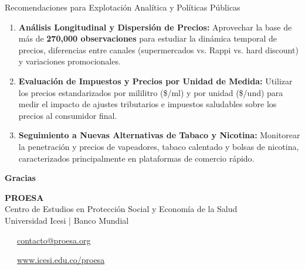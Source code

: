 \documentclass[aspectratio=169, 10pt]{beamer}
\begin{document}
\begin{frame}{Recomendaciones para Explotación Analítica y Políticas Públicas}
    \begin{enumerate}
        \setlength{\itemsep}{10pt}
        \item \textbf{\color{proesablue}Análisis Longitudinal y Dispersión de Precios:} 
        Aprovechar la base de más de \textbf{270,000 observaciones} para estudiar la dinámica temporal de precios, diferencias entre canales (supermercados vs. Rappi vs. hard discount) y variaciones promocionales.
        
        \item \textbf{\color{proesadark}Evaluación de Impuestos y Precios por Unidad de Medida:} 
        Utilizar los precios estandarizados por mililitro (\$/ml) y por unidad (\$/und) para medir el impacto de ajustes tributarios e impuestos saludables sobre los precios al consumidor final.
        
        \item \textbf{\color{proesagreen}Seguimiento a Nuevas Alternativas de Tabaco y Nicotina:} 
        Monitorear la penetración y precios de vapeadores, tabaco calentado y bolsas de nicotina, caracterizados principalmente en plataformas de comercio rápido.
    \end{enumerate}
\end{frame}

\begin{frame}[plain]
    
    \begin{center}
        \vspace{1.8cm}
        {\color{white}\Huge \textbf{Gracias}}
        
        \vspace{0.6cm}
        {\color{proesalight}\large \textbf{PROESA}} \\
        {\color{white}\small Centro de Estudios en Protección Social y Economía de la Salud} \\
        {\color{white}\footnotesize Universidad Icesi | Banco Mundial}
        
        \vspace{0.8cm}
        {\color{white}\large \faEnvelope\ \ \ \href{mailto:contacto@proesa.org}{contacto@proesa.org}}
        
        \vspace{0.3cm}
        {\color{proesalight}\large \faGlobe\ \ \ \href{http://www.icesi.edu.co/proesa}{www.icesi.edu.co/proesa}}
    \end{center}
\end{frame}
\end{document}
